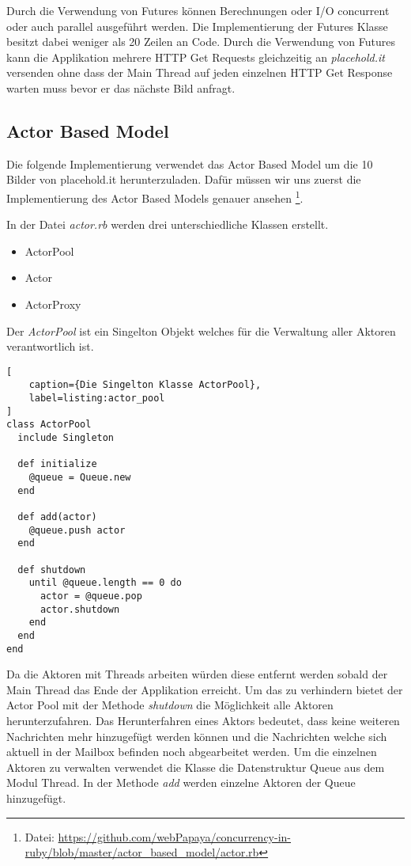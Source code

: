 Durch die Verwendung von Futures können Berechnungen oder I/O concurrent oder auch parallel ausgeführt werden. Die Implementierung der Futures Klasse besitzt dabei weniger als 20 Zeilen an Code. Durch die Verwendung von Futures kann die Applikation mehrere HTTP Get Requests gleichzeitig an \emph{placehold.it} versenden ohne dass der Main Thread auf jeden einzelnen HTTP Get Response warten muss bevor er das nächste Bild anfragt. 

\subsection{Actor Based Model}

Die folgende Implementierung verwendet das Actor Based Model um die 10 Bilder von placehold.it herunterzuladen. Dafür müssen wir uns zuerst die Implementierung des Actor Based Models genauer ansehen \footnote{Datei: \url{https://github.com/webPapaya/concurrency-in-ruby/blob/master/actor_based_model/actor.rb}}.

In der Datei \emph{actor.rb} werden drei unterschiedliche Klassen erstellt.

\begin{itemize}
  \item ActorPool
  \item Actor
  \item ActorProxy
\end{itemize}

Der \emph{ActorPool} ist ein Singelton Objekt welches für die Verwaltung aller Aktoren verantwortlich ist. 

\begin{lstlisting}[
	caption={Die Singelton Klasse ActorPool},
	label=listing:actor_pool
]
class ActorPool
  include Singleton

  def initialize
    @queue = Queue.new
  end

  def add(actor)
    @queue.push actor
  end

  def shutdown
    until @queue.length == 0 do
      actor = @queue.pop
      actor.shutdown
    end
  end
end
\end{lstlisting}

Da die Aktoren mit Threads arbeiten würden diese entfernt werden sobald der Main Thread das Ende der Applikation erreicht. Um das zu verhindern bietet der Actor Pool mit der Methode \emph{shutdown} die Möglichkeit alle Aktoren herunterzufahren. Das Herunterfahren eines Aktors bedeutet, dass keine weiteren Nachrichten mehr hinzugefügt werden können und die Nachrichten welche sich aktuell in der Mailbox befinden noch abgearbeitet werden. Um die einzelnen Aktoren zu verwalten verwendet die Klasse die Datenstruktur Queue aus dem Modul Thread. In der Methode \emph{add} werden einzelne Aktoren der Queue hinzugefügt. 

